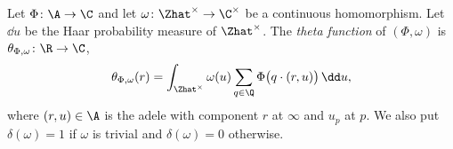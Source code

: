 Let $\Phi\colon\A\to\C$ and let $\omega\colon\Zhat^\times\to\C^\times$ be a continuous homomorphism. Let $\dd u$ be the
Haar probability measure of $\Zhat^\times$. The \emph{theta function} of $(\Phi,\omega)$ is
$\theta_{\Phi,\omega}\colon\R\to\C$,
\[
  \theta_{\Phi,\omega}(r)=\int_{\Zhat^\times}\omega(u)\sum_{q\in\Q}\Phi\bigl(q\cdot(r,u)\bigr)\,\dd u,
\]
where $(r,u)\in\A$ is the adele with component $r$ at $\infty$ and $u_p$ at $p$. We also put $\delta(\omega)=1$ if
$\omega$ is trivial and $\delta(\omega)=0$ otherwise.
